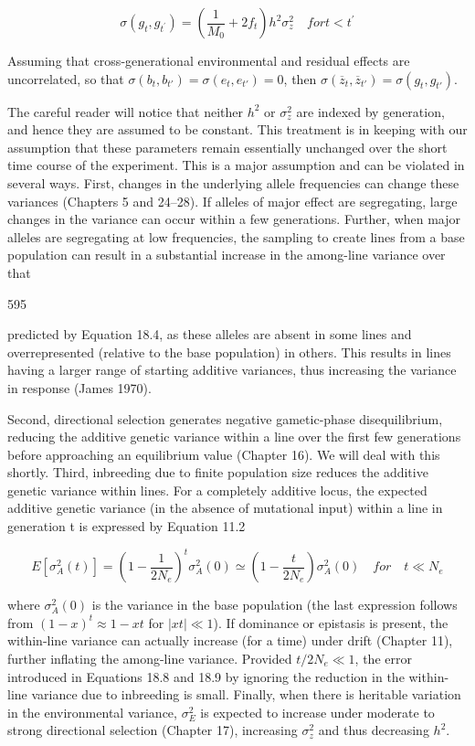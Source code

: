 \documentclass{article}
\begin{document}
\begin{equation}
\sigma(g_{t},g_{t^{\prime}})=\left(\frac{1}{M_{0}}+2f_{t}\right)h^{2}\sigma_{z}^{2}\quad for t<t^{\prime}
\tag{18.9}
\label{eq:18_9}
\end{equation}

Assuming that cross-generational environmental and residual effects are uncorrelated, so that  $ \sigma(b_t, b_{t'}) = \sigma(e_t, e_{t'}) = 0 $, then  $ \sigma(\overline{z}_t, \overline{z}_{t'}) = \sigma(g_t, g_{t'}) $.

The careful reader will notice that neither  $ h^2 $ or  $ \sigma_z^2 $ are indexed by generation, and hence they are assumed to be constant. This treatment is in keeping with our assumption that these parameters remain essentially unchanged over the short time course of the experiment. This is a major assumption and can be violated in several ways. First, changes in the underlying allele frequencies can change these variances (Chapters 5 and 24–28). If alleles of major effect are segregating, large changes in the variance can occur within a few generations. Further, when major alleles are segregating at low frequencies, the sampling to create lines from a base population can result in a substantial increase in the among-line variance over that

595

predicted by Equation 18.4, as these alleles are absent in some lines and overrepresented (relative to the base population) in others. This results in lines having a larger range of starting additive variances, thus increasing the variance in response (James 1970).

Second, directional selection generates negative gametic-phase disequilibrium, reducing the additive genetic variance within a line over the first few generations before approaching an equilibrium value (Chapter 16). We will deal with this shortly. Third, inbreeding due to finite population size reduces the additive genetic variance within lines. For a completely additive locus, the expected additive genetic variance (in the absence of mutational input) within a line in generation t is expressed by Equation 11.2

\begin{equation}
E\left[\sigma_{A}^{2}(t)\right]=\left(1-\frac{1}{2N_{e}}\right)^{t}\sigma_{A}^{2}(0)\simeq\left(1-\frac{t}{2N_{e}}\right)\sigma_{A}^{2}(0)\quad for\quad t\ll N_{e}
\end{equation}

where  $ \sigma_A^2(0) $ is the variance in the base population (the last expression follows from  $ (1-x)^t \approx 1 - xt $ for  $ |xt| \ll 1 $). If dominance or epistasis is present, the within-line variance can actually increase (for a time) under drift (Chapter 11), further inflating the among-line variance. Provided  $ t/2N_e \ll 1 $, the error introduced in Equations 18.8 and 18.9 by ignoring the reduction in the within-line variance due to inbreeding is small. Finally, when there is heritable variation in the environmental variance,  $ \sigma_E^2 $ is expected to increase under moderate to strong directional selection (Chapter 17), increasing  $ \sigma_z^2 $ and thus decreasing  $ h^2 $.
\end{document}
